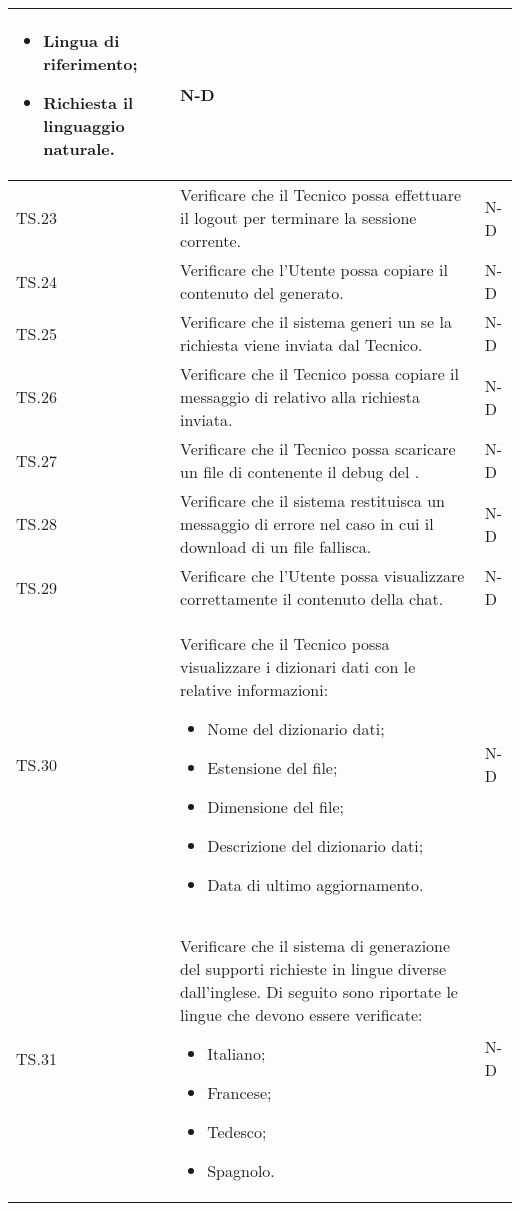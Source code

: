 \begin{adjustwidth}{-0.5cm}{-0.5cm}
\begin{longtable}{|P{1.5cm}|>{\raggedright}P{9.5cm}|>{\arraybackslash}P{1.5cm}|}
\begin{itemize}
			\item Lingua di riferimento;
			\item Richiesta il linguaggio naturale.
		\end{itemize} & N-D \\
		\hline TS.23 & Verificare che il Tecnico possa effettuare il logout per terminare la sessione corrente. & N-D \\ 
		\hline TS.24 & Verificare che l'Utente possa copiare il contenuto del  generato. & N-D \\ 
		\hline TS.25 & Verificare che il sistema generi un  se la richiesta viene inviata dal Tecnico. & N-D \\ 
		\hline TS.26 & Verificare che il Tecnico possa copiare il messaggio di  relativo alla richiesta inviata. & N-D \\ 
		\hline TS.27 & Verificare che il Tecnico possa scaricare un file di  contenente il debug del \prompt. & N-D \\
		\hline TS.28 & Verificare che il sistema restituisca un messaggio di errore nel caso in cui il download di un file fallisca. & N-D \\  
		\hline TS.29 & Verificare che l'Utente possa visualizzare correttamente il contenuto della chat. & N-D \\  
		\hline TS.30 & Verificare che il Tecnico possa visualizzare i dizionari dati con le relative informazioni:
		\begin{itemize}
			\item Nome del dizionario dati;
			\item Estensione del file;
			\item Dimensione del file;
			\item Descrizione del dizionario dati;
			\item Data di ultimo aggiornamento.
		\end{itemize} & N-D \\  
		\hline TS.31 & Verificare che il sistema di generazione del  supporti richieste in lingue diverse dall'inglese. Di seguito sono riportate le lingue che devono essere verificate: 
		\begin{itemize}
			\item Italiano;
			\item Francese;
			\item Tedesco;
			\item Spagnolo. 
		\end{itemize}
		& N-D \\  
	\end{longtable}
\end{adjustwidth}
\egroup

